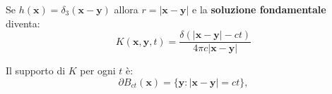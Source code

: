 \documentclass[10pt,a4paper,twoside,openright]{book}
\newcommand{\x}{\mathbf{x}}
\newcommand{\y}{\mathbf{y}}
\begin{document}
Se $\displaystyle h(\x) =\delta _{3}(\x -\y)$ allora $\displaystyle r=| \x -\y| $ e la \textbf{soluzione fondamentale} diventa:
\begin{equation}
    \boxed{K(\x ,\y ,t) =\frac{\delta (| \x -\y| -ct)}{4\pi c| \x -\y| }}
\end{equation}
\begin{oss}
    Il supporto di $K$ per ogni $t$ è:
    \begin{equation}
        \partial B_{ct}(\x) =\{\y :| \x -\y| =ct\} ,
    \end{equation}

    \begin{figure}[H]
        \centering


        \begin{tikzpicture}[x=0.75pt,y=0.75pt,yscale=-1,xscale=1]


\end{tikzpicture}
\end{figure}
\end{oss}
\end{document}
